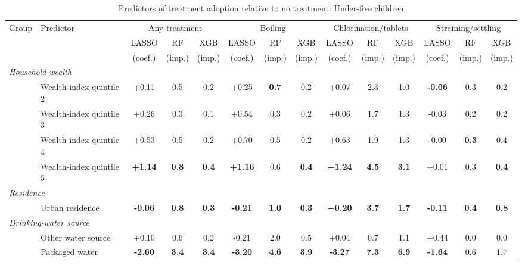 \begin{landscape}
\begin{table}[p]\centering
\caption{Predictors of treatment adoption relative to no treatment: Under-five children}
\label{tab:characteristics-by-treatment-u5}
\tiny\setlength{\tabcolsep}{1.8pt}\renewcommand{\arraystretch}{0.88}
\begin{adjustbox}{max width=\textwidth,center}
\begin{tabular}{ll*{12}{c}}
\toprule
Group & Predictor & \multicolumn{3}{c}{Any treatment} & \multicolumn{3}{c}{Boiling} & \multicolumn{3}{c}{Chlorination/tablets} & \multicolumn{3}{c}{Straining/settling} \\
 & & LASSO & RF & XGB & LASSO & RF & XGB & LASSO & RF & XGB & LASSO & RF & XGB \\
 & & (coef.) & (imp.) & (imp.) & (coef.) & (imp.) & (imp.) & (coef.) & (imp.) & (imp.) & (coef.) & (imp.) & (imp.) \\
\cmidrule(lr){3-5}\cmidrule(lr){6-8}\cmidrule(lr){9-11}\cmidrule(lr){12-14}
\midrule
\multicolumn{14}{l}{\textit{Household wealth}} \\
 & Wealth-index quintile 2 & +0.11 & 0.5 & 0.2 & +0.25 & \textbf{0.7} & 0.2 & +0.07 & 2.3 & 1.0 & \textbf{-0.06} & 0.3 & 0.2 \\
 & Wealth-index quintile 3 & +0.26 & 0.3 & 0.1 & +0.54 & 0.3 & 0.2 & +0.06 & 1.7 & 1.3 & -0.03 & 0.2 & 0.2 \\
 & Wealth-index quintile 4 & +0.53 & 0.5 & 0.2 & +0.70 & 0.5 & 0.2 & +0.63 & 1.9 & 1.3 & -0.00 & \textbf{0.3} & 0.4 \\
 & Wealth-index quintile 5 & \textbf{+1.14} & \textbf{0.8} & \textbf{0.4} & \textbf{+1.16} & 0.6 & \textbf{0.4} & \textbf{+1.24} & \textbf{4.5} & \textbf{3.1} & +0.01 & 0.3 & \textbf{0.4} \\
\multicolumn{14}{l}{\textit{Residence}} \\
 & Urban residence & \textbf{-0.06} & \textbf{0.8} & \textbf{0.3} & \textbf{-0.21} & \textbf{1.0} & \textbf{0.3} & \textbf{+0.20} & \textbf{3.7} & \textbf{1.7} & \textbf{-0.11} & \textbf{0.4} & \textbf{0.8} \\
\multicolumn{14}{l}{\textit{Drinking-water source}} \\
 & Other water source & +0.10 & 0.6 & 0.2 & -0.21 & 2.0 & 0.5 & +0.04 & 0.7 & 1.1 & +0.44 & 0.0 & 0.0 \\
 & Packaged water & \textbf{-2.60} & \textbf{3.4} & \textbf{3.4} & \textbf{-3.20} & \textbf{4.6} & \textbf{3.9} & \textbf{-3.27} & \textbf{7.3} & \textbf{6.9} & \textbf{-1.64} & 0.6 & 1.7 \\

\end{tabular}
\end{adjustbox}
\end{table}
\end{landscape}
